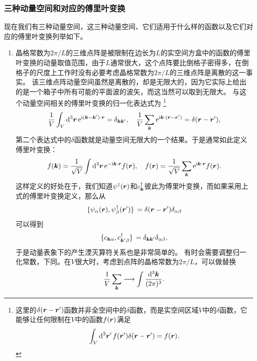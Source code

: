 \subsubsection{三种动量空间和对应的傅里叶变换}

现在我们有三种动量空间，这三种动量空间、它们适用于什么样的函数以及它们对应的傅里叶变换列举如下。

\begin{enumerate}
    \item 晶格常数为$2\pi / L$的三维点阵是被限制在边长为$L$的实空间方盒中的函数的傅里叶变换的动量取值范围，由于$L$通常很大，这个点阵要比倒格子密得多，在倒格子的尺度上工作时没有必要考虑晶格常数为$2\pi / L$的三维点阵是离散的这一事实。
    该三维点阵动量空间虽然是离散的，却是无限大的，因为它实际上给出的是一个箱子中所有可能的平面波的波矢，而这当然可以取到无限大。
    与这个动量空间相关的傅里叶变换的归一化表达式为%
    \footnote{
        这里的$\delta(\vb*{r} - \vb*{r}')$函数并非全空间中的$\delta$函数，而是实空间区域$V$中的$\delta$函数，它能够让任何限制在$V$中的函数$f(\vb*{r})$满足
        \[
            \int_V \dd[3]{\vb*{r}'} f(\vb*{r}') \delta(\vb*{r} - \vb*{r}') = f(\vb*{r}).
        \]
    }%
    \begin{equation}
        \frac{1}{V} \int_V \dd[3]{\vb*{r}} \mathrm{e}^{\mathrm{i} (\vb*{k} - \vb*{k}') \cdot \vb*{r}} = \delta_{\vb*{k} \vb*{k}'}, \quad \frac{1}{V} \sum_{\vb*{k}} \mathrm{e}^{\mathrm{i} \vb*{k} \cdot (\vb*{r} - \vb*{r}')} = \delta(\vb*{r} - \vb*{r}'),
    \end{equation}
    第二个表达式中的$\delta$函数就是动量空间无限大的一个结果。于是通常如此定义傅里叶变换：
    \begin{equation}
        f(\vb*{k}) = \frac{1}{\sqrt{V}} \int \dd[3]{\vb*{r}} \mathrm{e}^{- \mathrm{i} \vb*{k} \cdot \vb*{r}} f(\vb*{r}), \quad f(\vb*{r}) = \frac{1}{\sqrt{V}} \sum_{\vb*{k}} \mathrm{e}^{\mathrm{i} \vb*{k} \cdot \vb*{r}} f(\vb*{r}).
    \end{equation}
    这样定义的好处在于，我们知道${\psi}^\dagger(\vb*{r})$和${c}^\dagger_{\vb*{k}}$彼此为傅里叶变换，而如果采用上式的傅里叶变换定义，那么从
    \[
        \acomm*{{\psi}_\alpha(\vb*{r})}{{\psi}^\dagger_\beta(\vb*{r}')} = \delta(\vb*{r}-\vb*{r}') \delta_{\alpha \beta}
    \]
    可以得到
    \[
        \acomm*{{c}_{\vb*{k}\alpha}}{{c}^\dagger_{\vb*{k}' \beta}} = \delta_{\vb*{k} \vb*{k}'} \delta_{\alpha \beta},
    \]
    于是动量表象下的产生湮灭算符关系也是非常简单的。
    有时会需要调整归一化常数，下同。在$V$很大时，考虑到点阵的晶格常数为$2\pi / L$，可以做替换
    \begin{equation}
        \frac{1}{V} \sum_{\vb*{k}} \longrightarrow \int \frac{\dd[3]{\vb*{k}}}{(2\pi)^3}.

\end{equation}
\end{enumerate}
